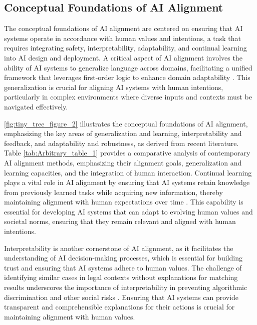 \subsection{Conceptual Foundations of AI Alignment} \label{subsec:Conceptual Foundations of AI Alignment}



The conceptual foundations of AI alignment are centered on ensuring that AI systems operate in accordance with human values and intentions, a task that requires integrating safety, interpretability, adaptability, and continual learning into AI design and deployment. A critical aspect of AI alignment involves the ability of AI systems to generalize language across domains, facilitating a unified framework that leverages first-order logic to enhance domain adaptability \cite{hsu2023whatsleftconceptgrounding}. This generalization is crucial for aligning AI systems with human intentions, particularly in complex environments where diverse inputs and contexts must be navigated effectively.

\autoref{fig:tiny_tree_figure_2} illustrates the conceptual foundations of AI alignment, emphasizing the key areas of generalization and learning, interpretability and feedback, and adaptability and robustness, as derived from recent literature. Table \ref{tab:Arbitrary_table_1} provides a comparative analysis of contemporary AI alignment methods, emphasizing their alignment goals, generalization and learning capacities, and the integration of human interaction. Continual learning plays a vital role in AI alignment by ensuring that AI systems retain knowledge from previously learned tasks while acquiring new information, thereby maintaining alignment with human expectations over time \cite{chitale2023taskarithmeticloracontinual}. This capability is essential for developing AI systems that can adapt to evolving human values and societal norms, ensuring that they remain relevant and aligned with human intentions.

Interpretability is another cornerstone of AI alignment, as it facilitates the understanding of AI decision-making processes, which is essential for building trust and ensuring that AI systems adhere to human values. The challenge of identifying similar cases in legal contexts without explanations for matching results underscores the importance of interpretability in preventing algorithmic discrimination and other social risks \cite{lin2023interpretabilityframeworksimilarcase}. Ensuring that AI systems can provide transparent and comprehensible explanations for their actions is crucial for maintaining alignment with human values.

